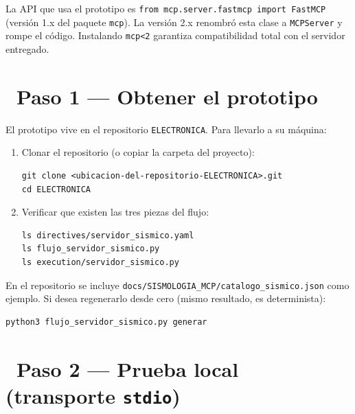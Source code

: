 \documentclass[11pt,a4paper]{article}
\newcommand{\iconotexto}[2]{\textcolor{cyanNeon}{\faIcon{#1}}~#2}
\begin{document}
\begin{tcolorbox}[cajaRecomendacion, title={\faIcon{info-circle}~Por qu\'e pin \texttt{mcp<2}}]
La API que usa el prototipo es \texttt{from mcp.server.fastmcp import FastMCP} (versi\'on 1.x del
paquete \texttt{mcp}). La versi\'on 2.x renombr\'o esta clase a \texttt{MCPServer} y rompe el c\'odigo.
Instalando \texttt{mcp<2} garantiza compatibilidad total con el servidor entregado.
\end{tcolorbox}

\section{\iconotexto{download}{Paso 1 --- Obtener el prototipo}}

El prototipo vive en el repositorio \texttt{ELECTRONICA}. Para llevarlo a su m\'aquina:

\begin{enumerate}[leftmargin=1.8em, itemsep=4pt]
  \item Clonar el repositorio (o copiar la carpeta del proyecto):
\begin{lstlisting}
git clone <ubicacion-del-repositorio-ELECTRONICA>.git
cd ELECTRONICA
\end{lstlisting}
  \item Verificar que existen las tres piezas del flujo:
\begin{lstlisting}
ls directives/servidor_sismico.yaml
ls flujo_servidor_sismico.py
ls execution/servidor_sismico.py
\end{lstlisting}
\end{enumerate}

\begin{tcolorbox}[cajaContenido, title={\faIcon{bolt}~Nota: el cat\'alogo sint\'etico ya est\'a generado}]
En el repositorio se incluye \texttt{docs/SISMOLOGIA\_MCP/catalogo\_sismico.json} como ejemplo.
Si desea regenerarlo desde cero (mismo resultado, es determinista):
\begin{lstlisting}
python3 flujo_servidor_sismico.py generar
\end{lstlisting}
\end{tcolorbox}

\section{\iconotexto{flask}{Paso 2 --- Prueba local (transporte \texttt{stdio})}}
\end{document}
